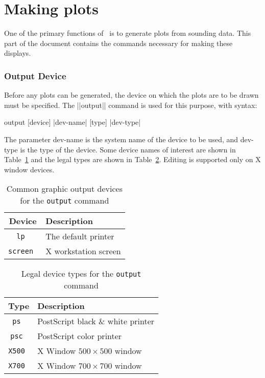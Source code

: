 \part{Making plots}
\label{part-plot}
One of the primary functions of \suds\ is to generate plots from sounding
data.  This part of the document contains the commands necessary for
making these displays.

\section{Output Device}
Before any plots can be generated, the device on which the plots are to be
drawn must be specified.  The ||output|| command is used for this purpose,
with syntax:
\begin{example}
	output [device] |dev-name| [type] |dev-type|
\end{example}
The parameter {\pf dev-name} is the system name of the device to be used, and
{\pf dev-type} is the type of the device.  Some device names of interest
are shown in Table~\ref{tbl-dev} and the legal types are shown in 
Table~\ref{tbl-type}.  Editing is supported only on X window devices.

\begin{table}[tp]
	\begin{center}
	\begin{tabular}{|c|l|}
		\hline
		Device		& Description \\ \hline \hline
		\tt lp		& The default printer \\
		\tt screen	& X workstation screen \\ \hline
	\end{tabular}
	\end{center}
	\caption{Common graphic output devices for the {\tt output} command}
	\label{tbl-dev}
\end{table}

\begin{table}[tp]
	\begin{center}
	\begin{tabular}{|c|l|}
		\hline
		Type		& Description \\ \hline\hline
		\tt ps		& PostScript black \& white printer \\
		\tt psc		& PostScript color printer \\
		\tt X500	& X Window $500 \times 500$ window \\
		\tt X700 	& X Window $700 \times 700$ window \\
		\hline
	\end{tabular}
	\end{center}
	\caption{Legal device types for the {\tt output} command}
	\label{tbl-type}
\end{table}

